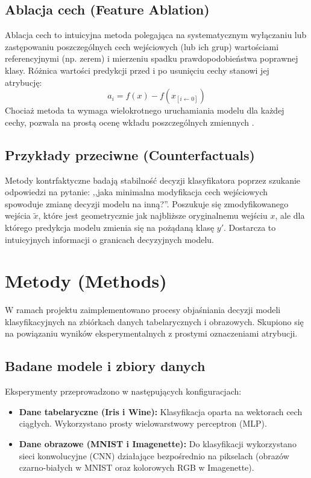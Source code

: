 \documentclass[conference]{IEEEtran}
\begin{document}
\subsection{Ablacja cech (Feature Ablation)}
Ablacja cech to intuicyjna metoda polegająca na systematycznym wyłączaniu lub zastępowaniu poszczególnych cech wejściowych (lub ich grup) wartościami referencyjnymi (np. zerem) i mierzeniu spadku prawdopodobieństwa poprawnej klasy. Różnica wartości predykcji przed i po usunięciu cechy stanowi jej atrybucję:
\begin{equation}
a_i = f(x) - f(x_{[i \leftarrow 0]})
\end{equation}
Chociaż metoda ta wymaga wielokrotnego uruchamiania modelu dla każdej cechy, pozwala na prostą ocenę wkładu poszczególnych zmiennych \cite{Zeiler2014}.

\subsection{Przykłady przeciwne (Counterfactuals)}
Metody kontrfaktyczne \cite{Wachter2017} badają stabilność decyzji klasyfikatora poprzez szukanie odpowiedzi na pytanie: ,,jaka minimalna modyfikacja cech wejściowych spowoduje zmianę decyzji modelu na inną?''. Poszukuje się zmodyfikowanego wejścia $\tilde{x}$, które jest geometrycznie jak najbliższe oryginalnemu wejściu $x$, ale dla którego predykcja modelu zmienia się na pożądaną klasę $y'$. Dostarcza to intuicyjnych informacji o granicach decyzyjnych modelu.

\section{Metody (Methods)}
W ramach projektu zaimplementowano procesy objaśniania decyzji modeli klasyfikacyjnych na zbiórkach danych tabelarycznych i obrazowych. Skupiono się na powiązaniu wyników eksperymentalnych z prostymi oznaczeniami atrybucji.

\subsection{Badane modele i zbiory danych}
Eksperymenty przeprowadzono w następujących konfiguracjach:
\begin{itemize}
    \item \textbf{Dane tabelaryczne (Iris i Wine):} Klasyfikacja oparta na wektorach cech ciągłych. Wykorzystano prosty wielowarstwowy perceptron (MLP).
    \item \textbf{Dane obrazowe (MNIST i Imagenette):} Do klasyfikacji wykorzystano sieci konwolucyjne (CNN) działające bezpośrednio na pikselach (obrazów czarno-białych w MNIST oraz kolorowych RGB w Imagenette).
\end{itemize}
\end{document}
